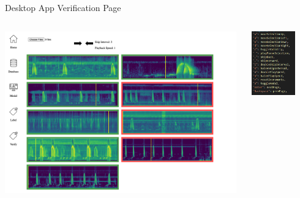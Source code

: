\begin{frame}{Desktop App Verification Page}
    \begin{columns}
        \begin{column}{0.7\textwidth}
        \centering
     \includegraphics[height=0.9\textheight,width=0.99\textwidth,keepaspectratio]{images/verification_page.png}
        \end{column}
        \begin{column}{0.3\textwidth}
            \centering
            \includegraphics[height=0.6\textheight,width=0.7\textwidth,keepaspectratio]{images/verify_keys.png}
           
        \end{column}
    \end{columns}
\end{frame}

